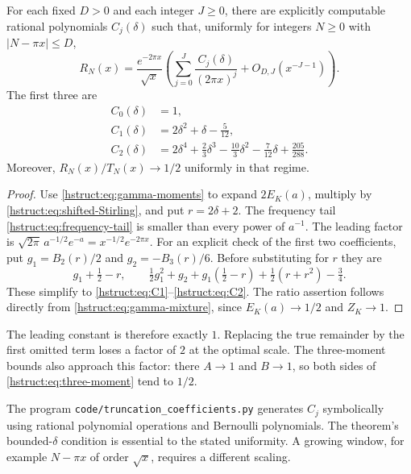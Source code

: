 \begin{theorem}\label{hstruct:thm:sharp}
For each fixed $D>0$ and each integer $J\ge0$, there are explicitly
computable rational polynomials $C_j(\delta)$ such that, uniformly
for integers $N\ge0$ with $|N-\pi x|\le D$,
\begin{equation}\label{hstruct:eq:all-orders}
 R_N(x)=\frac{e^{-2\pi x}}{\sqrt{x}}
 \left(\sum_{j=0}^{J}\frac{C_j(\delta)}{(2\pi x)^j}
       +O_{D,J}(x^{-J-1})\right).
\end{equation}
The first three are
\begin{align}
 C_0(\delta)&=1,\nonumber\\
 C_1(\delta)&=2\delta^2+\delta-\frac5{12},\label{hstruct:eq:C1}\\
 C_2(\delta)&=2\delta^4+\frac23\delta^3-\frac{10}3\delta^2
                         -\frac7{12}\delta+\frac{205}{288}.
 \label{hstruct:eq:C2}
\end{align}
Moreover, $R_N(x)/T_N(x)\longrightarrow1/2$ uniformly in that regime.
\end{theorem}
\begin{proof}
Use \eqref{hstruct:eq:gamma-moments} to expand $2E_K(a)$, multiply by
\eqref{hstruct:eq:shifted-Stirling}, and put $r=2\delta+2$.
The frequency tail \eqref{hstruct:eq:frequency-tail} is smaller than every
power of $a^{-1}$. The leading factor is
$\sqrt{2\pi}\,a^{-1/2}e^{-a}=x^{-1/2}e^{-2\pi x}$.
For an explicit check of the first two coefficients, put
$g_1=B_2(r)/2$ and $g_2=-B_3(r)/6$. Before substituting for $r$ they are
\[
 g_1+\tfrac12-r,\qquad
 \tfrac12g_1^2+g_2+g_1(\tfrac12-r)
                       +\tfrac12(r+r^2)-\tfrac34.
\]
These simplify to \eqref{hstruct:eq:C1}--\eqref{hstruct:eq:C2}. The ratio assertion
follows directly from \eqref{hstruct:eq:gamma-mixture}, since $E_K(a)\to1/2$
and $Z_K\to1$.
\end{proof}

The leading constant is therefore exactly $1$. Replacing the true
remainder by the first omitted term loses a factor of $2$ at the
optimal scale. The three-moment bounds also approach this factor:
there $A\to1$ and $B\to1$, so both sides of
\eqref{hstruct:eq:three-moment} tend to $1/2$.

The program \texttt{code/truncation\_coefficients.py} generates
$C_j$ symbolically using rational polynomial operations and
Bernoulli polynomials. The theorem's bounded-$\delta$ condition is
essential to the stated uniformity. A growing window, for example
$N-\pi x$ of order $\sqrt{x}$, requires a different scaling.


